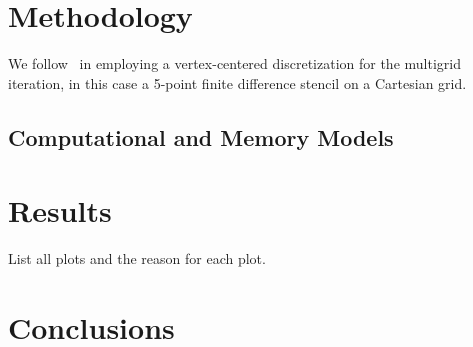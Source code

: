 \section{Methodology}

We follow~\cite{BrandtDiskin1994} in employing a vertex-centered discretization for the multigrid iteration, in this
case a 5-point finite difference stencil on a Cartesian grid.

\subsection{Computational and Memory Models}

\section{Results}

List all plots and the reason for each plot.

\section{Conclusions}
